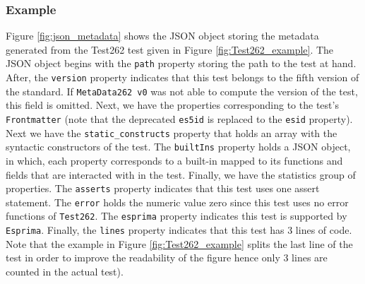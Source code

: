 \documentclass[runningheads]{llncs}
\begin{document}
\subsubsection{Example}

Figure \ref{fig:json_metadata} shows the JSON object storing the metadata generated from the Test262 test given in Figure \ref{fig:Test262_example}. 
The JSON object begins with the \texttt{path} property storing the path to the test at hand. After, the \texttt{version} property indicates that this test belongs to the fifth version of the standard. If \texttt{MetaData262 v0} was not able to compute the version of the test, this field is omitted. Next, we have the properties corresponding to the test's \texttt{Frontmatter} (note that the deprecated \texttt{es5id} is replaced to the \texttt{esid} property).
Next we have the \texttt{static\_constructs} property that holds an array with the syntactic constructors of the test. The \texttt{builtIns} property holds a JSON object, in which, each property corresponds to a built-in mapped to its functions and fields that are interacted with in the test. Finally, we have the statistics group of properties. The \texttt{asserts} property indicates that this test uses one assert statement. The \texttt{error} holds the numeric value zero since this test uses no error functions of \texttt{Test262}. The \texttt{esprima} property indicates this test is supported by \texttt{Esprima}. Finally, the \texttt{lines} property indicates that this test has 3 lines of code. Note that the example in Figure \ref{fig:Test262_example} splits the last line of the test in order to improve the readability of the figure hence only 3 lines are counted in the actual test).
\end{document}
